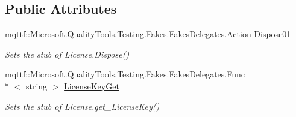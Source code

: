 \subsection*{Public Attributes}
\begin{DoxyCompactItemize}
\item 
mqttf\-::\-Microsoft.\-Quality\-Tools.\-Testing.\-Fakes.\-Fakes\-Delegates.\-Action \hyperlink{class_system_1_1_component_model_1_1_fakes_1_1_stub_license_a83fa3bd11271d064e6fa0ccdb879459e}{Dispose01}
\begin{DoxyCompactList}\small\item\em Sets the stub of License.\-Dispose()\end{DoxyCompactList}\item 
mqttf\-::\-Microsoft.\-Quality\-Tools.\-Testing.\-Fakes.\-Fakes\-Delegates.\-Func\\*
$<$ string $>$ \hyperlink{class_system_1_1_component_model_1_1_fakes_1_1_stub_license_a128ec995a70c320712e5c844b6c6cf35}{License\-Key\-Get}
\begin{DoxyCompactList}\small\item\em Sets the stub of License.\-get\-\_\-\-License\-Key()\end{DoxyCompactList}\end{DoxyCompactItemize}
